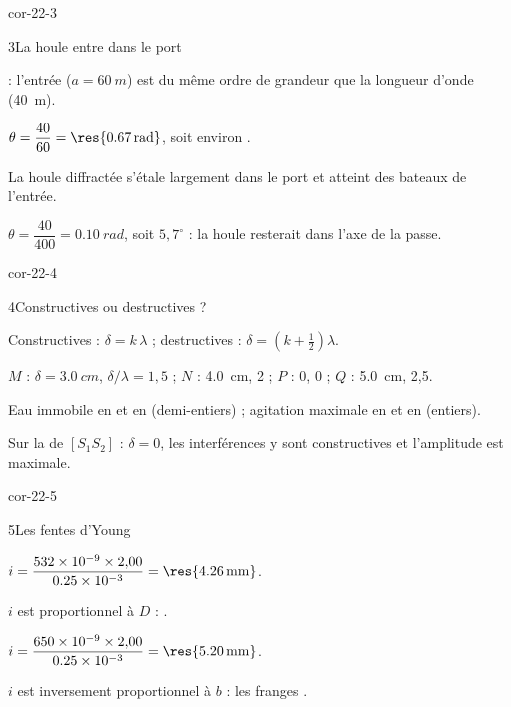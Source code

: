 \begin{blocLivre}{cor-22-3}
\begin{corrige}{3}{La houle entre dans le port}
\begin{questions}
\item {} : l'entrée ($a=\qty{60}{m}$) est du même ordre de grandeur que la longueur d'onde (\qty{40}{m}).
\item $\theta=\dfrac{40}{60}=\res{\qty{0,67}{rad}}$, soit environ .
\item La houle diffractée s'étale largement dans le port et atteint des bateaux  de l'entrée.
\item $\theta=\dfrac{40}{400}=\qty{0,10}{rad}$, soit $5{,}7^\circ$ : la houle resterait  dans l'axe de la passe.
\end{questions}
\end{corrige}
\end{blocLivre}
\begin{blocLivre}{cor-22-4}
\begin{corrige}{4}{Constructives ou destructives ?}
\begin{questions}
\item Constructives : $\delta=k\,\lambda$ ; destructives : $\delta=\left(k+\frac12\right)\lambda$.
\item $M$ : $\delta=\qty{3,0}{cm}$, $\delta/\lambda=1{,}5$ ; $N$ : \qty{4,0}{cm}, 2 ; $P$ : 0, 0 ; $Q$ : \qty{5,0}{cm}, 2,5.
\item Eau immobile en  et en  (demi-entiers) ; agitation maximale en  et en  (entiers).
\item Sur la  de $[S_1S_2]$ : $\delta=0$, les interférences y sont constructives et l'amplitude est
maximale.
\end{questions}
\end{corrige}
\end{blocLivre}
\begin{blocLivre}{cor-22-5}
\begin{corrige}{5}{Les fentes d'Young}
\begin{questions}
\item $i=\dfrac{\num{532e-9}\times2{,}00}{\num{0.25e-3}}=\res{\qty{4,26}{mm}}$.
\item $i$ est proportionnel à $D$ : .
\item $i=\dfrac{\num{650e-9}\times2{,}00}{\num{0.25e-3}}=\res{\qty{5,20}{mm}}$.
\item $i$ est inversement proportionnel à $b$ : les franges .
\end{questions}
\end{corrige}
\end{blocLivre}
